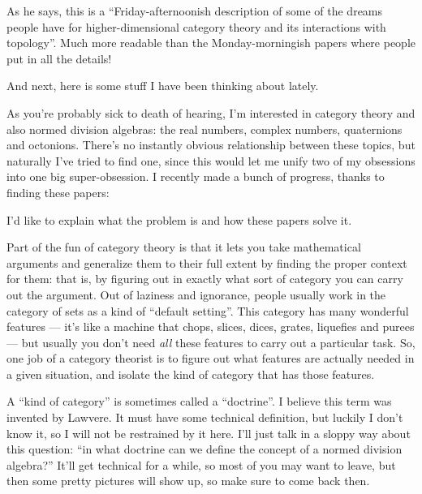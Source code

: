 \documentclass{article}
\renewcommand{\texttt}[1]{%
  \begingroup
  \ttfamily
  \begingroup\lccode`~=`/\lowercase{\endgroup\def~}{/\discretionary{}{}{}}%
  \begingroup\lccode`~=`[\lowercase{\endgroup\def~}{[\discretionary{}{}{}}%
  \begingroup\lccode`~=`.\lowercase{\endgroup\def~}{.\discretionary{}{}{}}%
  \catcode`/=\active\catcode`[=\active\catcode`.=\active
  \scantokens{#1\noexpand}%
  \endgroup
}
\begin{document}
As he says, this is a ``Friday-afternoonish description of some of the
dreams people have for higher-dimensional category theory and its
interactions with topology''. Much more readable than the
Monday-morningish papers where people put in all the details!

And next, here is some stuff I have been thinking about lately.

As you're probably sick to death of hearing, I'm interested in category
theory and also normed division algebras: the real numbers, complex
numbers, quaternions and octonions. There's no instantly obvious
relationship between these topics, but naturally I've tried to find one,
since this would let me unify two of my obsessions into one big
super-obsession. I recently made a bunch of progress, thanks to finding
these papers:


I'd like to explain what the problem is and how these papers solve it.

Part of the fun of category theory is that it lets you take mathematical
arguments and generalize them to their full extent by finding the proper
context for them: that is, by figuring out in exactly what sort of
category you can carry out the argument. Out of laziness and ignorance,
people usually work in the category of sets as a kind of ``default
setting''. This category has many wonderful features --- it's like a
machine that chops, slices, dices, grates, liquefies and purees --- but
usually you don't need \emph{all} these features to carry out a
particular task. So, one job of a category theorist is to figure out
what features are actually needed in a given situation, and isolate the
kind of category that has those features.

A ``kind of category'' is sometimes called a ``doctrine''. I believe
this term was invented by Lawvere. It must have some technical
definition, but luckily I don't know it, so I will not be restrained by
it here. I'll just talk in a sloppy way about this question: ``in what
doctrine can we define the concept of a normed division algebra?'' It'll
get technical for a while, so most of you may want to leave, but then
some pretty pictures will show up, so make sure to come back then.
\end{document}
